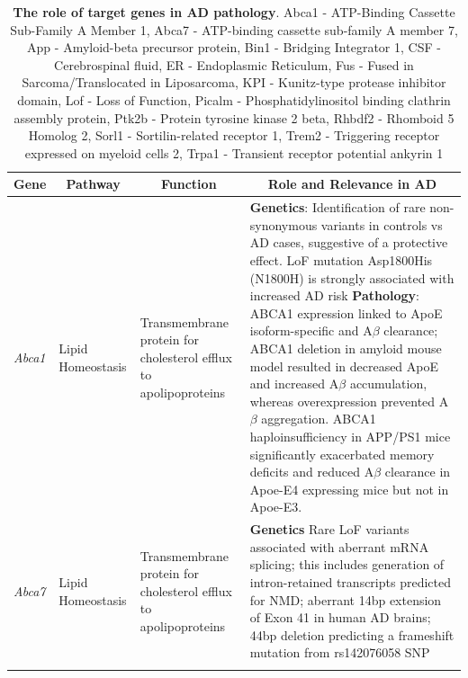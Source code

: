 \begin{changemargin}{1.5cm}
	\begin{landscape}
		\small %
		\setlength\tabcolsep{2pt} %
		\renewcommand{\arraystretch}{1}
		\begin{longtable}[c]{p{1cm}p{2cm}p{4cm}p{19cm}}
			\caption[The role of target genes in AD pathology]%
			{\textbf{The role of target genes in AD pathology}. Abca1 - ATP-Binding Cassette Sub-Family A Member 1, Abca7 - ATP-binding cassette sub-family A member 7, App - Amyloid-beta precursor protein, Bin1 - Bridging Integrator 1, CSF - Cerebrospinal fluid, ER - Endoplasmic Reticulum, Fus - Fused in Sarcoma/Translocated in Liposarcoma, KPI - Kunitz-type protease inhibitor domain, Lof - Loss of Function, Picalm - Phosphatidylinositol binding clathrin assembly protein, Ptk2b - Protein tyrosine kinase 2 beta,  Rhbdf2 - Rhomboid 5 Homolog 2, Sorl1 - Sortilin-related receptor 1, Trem2 - Triggering receptor expressed on myeloid cells 2, Trpa1 - Transient receptor potential ankyrin 1}
			\label{tab: TargetGenes_LitReview}\\
			
			\toprule
			\multicolumn{1}{c}{Gene} &
			\multicolumn{1}{c}{Pathway} &
			\multicolumn{1}{c}{Function} &
			\multicolumn{1}{c}{Role and Relevance in AD} \\* \midrule
			\endfirsthead	%
			\endhead%
			\bottomrule
			\endfoot%
			\endlastfoot%
			\centering \textit{Abca1} &
			\centering Lipid Homeostasis  &
			\centering Transmembrane protein for cholesterol efflux to apolipoproteins \newline &
			\tabitem\textbf{Genetics}: Identification of rare non-synonymous variants in controls vs AD cases, suggestive of a protective effect. LoF mutation Asp1800His (N1800H) is strongly associated with increased AD risk \cite{Nordestgaard2015} \newline
			\tabitem \textbf{Pathology}: ABCA1 expression linked to ApoE isoform-specific and A$\beta$ clearance; ABCA1 deletion in amyloid mouse model resulted in decreased ApoE and increased A$\beta$ accumulation, whereas overexpression prevented A$\beta$ aggregation\cite{Koldamova2014}. ABCA1 haploinsufficiency in APP/PS1 mice significantly exacerbated memory deficits and reduced A$\beta$ clearance in Apoe-E4 expressing mice but not in Apoe-E3\cite{Fitz2012}.\ \\
			\hdashline[0.5pt/5pt]
			
			\centering \textit{Abca7} &
			\centering Lipid Homeostasis  &
			\centering Transmembrane protein for cholesterol efflux to apolipoproteins  &
			\tabitem \textbf{Genetics} Rare LoF variants associated with aberrant mRNA splicing; this includes generation of intron-retained transcripts predicted for NMD\cite{Steinberg2015,Cuyvers2015,Guennec2016};  aberrant 14bp extension of Exon 41 in human AD brains\cite{Steinberg2015,Grear2009}; 44bp deletion predicting a frameshift mutation from rs142076058 SNP \cite{Cukier2016} \\
			\hdashline[0.5pt/5pt]
			

\end{longtable}
\end{landscape}
\end{changemargin}
